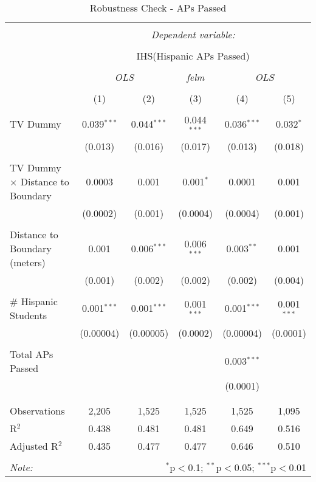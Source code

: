 
\begin{table}[!htbp] \centering 
  \caption{Robustness Check - APs Passed} 
  \label{} 
\begin{tabular}{@{\extracolsep{-2pt}}lccccc} 
\\[-1.8ex]\hline 
\hline \\[-1.8ex] 
 & \multicolumn{5}{c}{\textit{Dependent variable:}} \\ 
\cline{2-6} 
\\[-1.8ex] & \multicolumn{5}{c}{IHS(Hispanic APs Passed)} \\ 
\\[-1.8ex] & \multicolumn{2}{c}{\textit{OLS}} & \textit{felm} & \multicolumn{2}{c}{\textit{OLS}} \\ 
\\[-1.8ex] & (1) & (2) & (3) & (4) & (5)\\ 
\hline \\[-1.8ex] 
 TV Dummy & 0.039$^{***}$ & 0.044$^{***}$ & 0.044$^{***}$ & 0.036$^{***}$ & 0.032$^{*}$ \\ 
  & (0.013) & (0.016) & (0.017) & (0.013) & (0.018) \\ 
  & & & & & \\ 
 TV Dummy $\times$ Distance to Boundary & 0.0003 & 0.001 & 0.001$^{*}$ & 0.0001 & 0.001 \\ 
  & (0.0002) & (0.001) & (0.0004) & (0.0004) & (0.001) \\ 
  & & & & & \\ 
 Distance to Boundary (meters) & 0.001 & 0.006$^{***}$ & 0.006$^{***}$ & 0.003$^{**}$ & 0.001 \\ 
  & (0.001) & (0.002) & (0.002) & (0.002) & (0.004) \\ 
  & & & & & \\ 
 \# Hispanic Students & 0.001$^{***}$ & 0.001$^{***}$ & 0.001$^{***}$ & 0.001$^{***}$ & 0.001$^{***}$ \\ 
  & (0.00004) & (0.00005) & (0.0002) & (0.00004) & (0.0001) \\ 
  & & & & & \\ 
 Total APs Passed &  &  &  & 0.003$^{***}$ &  \\ 
  &  &  &  & (0.0001) &  \\ 
  & & & & & \\ 
\hline \\[-1.8ex] 
Observations & 2,205 & 1,525 & 1,525 & 1,525 & 1,095 \\ 
R$^{2}$ & 0.438 & 0.481 & 0.481 & 0.649 & 0.516 \\ 
Adjusted R$^{2}$ & 0.435 & 0.477 & 0.477 & 0.646 & 0.510 \\ 
\hline 
\hline \\[-1.8ex] 
\textit{Note:}  & \multicolumn{5}{r}{$^{*}$p$<$0.1; $^{**}$p$<$0.05; $^{***}$p$<$0.01} \\ 
\end{tabular} 
\end{table} 
